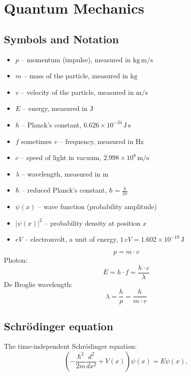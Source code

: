 \section{Quantum Mechanics}
\subsection{Symbols and Notation}
\begin{itemize}
    \item $p$ -- momentum (impulse), measured in $\mathrm{kg\,m/s}$
    \item $m$ -- mass of the particle, measured in $\mathrm{kg}$
    \item $v$ -- velocity of the particle, measured in $\mathrm{m/s}$
    \item $E$ -- energy, measured in $\mathrm{J}$
    \item $h$ -- Planck's constant, $6.626 \times 10^{-34}\,\mathrm{J\,s}$
    \item $f$ sometimes $v$ -- frequency, measured in $\mathrm{Hz}$
    \item $c$ -- speed of light in vacuum, $2.998 \times 10^8\,\mathrm{m/s}$
    \item $\lambda$ -- wavelength, measured in $\mathrm{m}$
    \item $\hbar$ -- reduced Planck's constant, $\hbar = \frac{h}{2\pi}$
    \item $\psi(x)$ -- wave function (probability amplitude)
    \item $|\psi(x)|^2$ -- probability density at position $x$
    \item \(eV\) -- electronvolt, a unit of energy, \(1\,eV = 1.602 \times 10^{-19}\,\mathrm{J}\)
\end{itemize}
\begin{equation*}
    p = m \cdot v
\end{equation*}
Photon:
\begin{equation*}
    E = h \cdot f = \frac{h \cdot c}{\lambda}
\end{equation*}
De Broglie wavelength:
\begin{equation*}
    \lambda = \frac{h}{p} = \frac{h}{m \cdot v}
\end{equation*}
\subsection{Schrödinger equation}
The time-independent Schrödinger equation:
\begin{equation*}
    \label{eq:time-independent-schroedinger}
\left(-\frac{\hbar^2}{2m} \frac{d^2}{dx^2} + V(x)\right) \psi(x) = E \psi(x),
\end{equation*}

